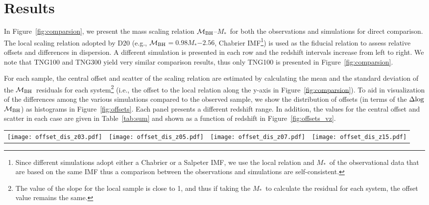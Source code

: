 \documentclass[twocolumn]{aastex631}
\def\smass{{$M_*$}}
\def\mbh{$\mathcal M_{\rm BH}$}
\begin{document}
\section{Results} \label{sec:result}
In Figure~\ref{fig:comparsion}, we present the mass scaling relation \mbh--\smass\ for both the observations and simulations for direct comparison. The local scaling relation adopted by D20 (e.g., \mbh$=0.98$\smass$-2.56$, Chabrier IMF\footnote{Since different simulations adopt either a Chabrier or a Salpeter IMF, we use the local relation and \smass\ of the observational data that are based on the same IMF thus a comparison between the observations and simulations are self-consistent.}) is used as the fiducial relation to assess relative offsets and differences in dispersion. A different simulation is presented in each row and the redshift intervals increase from left to right. We note that TNG100 and TNG300 yield very similar comparison results, thus only TNG100 is presented in Figure~\ref{fig:comparsion}.

For each sample, the central offset and scatter of the scaling relation are estimated by calculating the mean and the standard deviation of the \mbh\ residuals for each system\footnote{The value of the slope for the local sample is close to 1, and thus if taking the \smass\ to calculate the residual for each system, the offset value remains the same.} (i.e., the offset to the local relation along the y-axis in Figure~\ref{fig:comparsion}).  To aid in visualization of the differences among the various simulations compared to the observed sample, we show the distribution of offsets (in terms of the $\Delta{\rm log}$\mbh) as histograms in Figure~\ref{fig:offsets}. Each panel presents a different redshift range. In addition, the values for the central offset and scatter in each case are given in Table~\ref{tab:sum} and shown as a function of redshift in Figure~\ref{fig:offsets_vz}.



\begin{figure*}
\centering
\begin{tabular}{c c c c}
\hspace*{-0.4cm} 
{\texttt{[image: offset\_dis\_z03.pdf]}}&
\hspace*{-0.4cm} 
{\texttt{[image: offset\_dis\_z05.pdf]}}&
\hspace*{-0.4cm} 
{\texttt{[image: offset\_dis\_z07.pdf]}}&
\hspace*{-0.4cm} 
{\texttt{[image: offset\_dis\_z15.pdf]}}\\
\end{tabular}
\caption{\label{fig:offsets} 
Histograms of the offset distributions for all simulation samples and observations. The mean value and the standard derivation of the histogram are summarized in Table~\ref{tab:sum}. The vertical dashed lines show the corresponding mean value for each distribution. The mean values for observed sample (i.e., yellow lines) are also show in each simulation plots.
For the MBII simulation, the sample at redshift 0.6 is used to compare with other samples at $z=0.5$ and $z=0.7$.
}
\end{figure*} 
\end{document}
